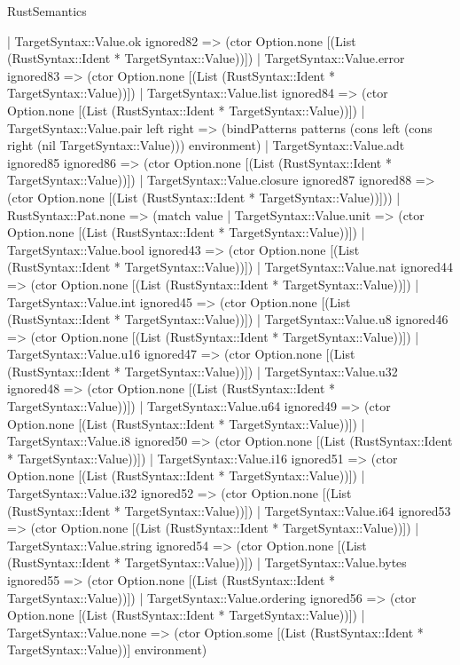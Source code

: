 \begin{lexlean}{RustSemantics}
\begin{semanticmodule}
{      | TargetSyntax::Value.ok ignored82 => (ctor Option.none [(List (RustSyntax::Ident * TargetSyntax::Value))])
      | TargetSyntax::Value.error ignored83 => (ctor Option.none [(List (RustSyntax::Ident * TargetSyntax::Value))])
      | TargetSyntax::Value.list ignored84 => (ctor Option.none [(List (RustSyntax::Ident * TargetSyntax::Value))])
      | TargetSyntax::Value.pair left right => (bindPatterns patterns (cons left (cons right (nil TargetSyntax::Value))) environment)
      | TargetSyntax::Value.adt ignored85 ignored86 => (ctor Option.none [(List (RustSyntax::Ident * TargetSyntax::Value))])
      | TargetSyntax::Value.closure ignored87 ignored88 => (ctor Option.none [(List (RustSyntax::Ident * TargetSyntax::Value))]))
    | RustSyntax::Pat.none => (match value
      | TargetSyntax::Value.unit => (ctor Option.none [(List (RustSyntax::Ident * TargetSyntax::Value))])
      | TargetSyntax::Value.bool ignored43 => (ctor Option.none [(List (RustSyntax::Ident * TargetSyntax::Value))])
      | TargetSyntax::Value.nat ignored44 => (ctor Option.none [(List (RustSyntax::Ident * TargetSyntax::Value))])
      | TargetSyntax::Value.int ignored45 => (ctor Option.none [(List (RustSyntax::Ident * TargetSyntax::Value))])
      | TargetSyntax::Value.u8 ignored46 => (ctor Option.none [(List (RustSyntax::Ident * TargetSyntax::Value))])
      | TargetSyntax::Value.u16 ignored47 => (ctor Option.none [(List (RustSyntax::Ident * TargetSyntax::Value))])
      | TargetSyntax::Value.u32 ignored48 => (ctor Option.none [(List (RustSyntax::Ident * TargetSyntax::Value))])
      | TargetSyntax::Value.u64 ignored49 => (ctor Option.none [(List (RustSyntax::Ident * TargetSyntax::Value))])
      | TargetSyntax::Value.i8 ignored50 => (ctor Option.none [(List (RustSyntax::Ident * TargetSyntax::Value))])
      | TargetSyntax::Value.i16 ignored51 => (ctor Option.none [(List (RustSyntax::Ident * TargetSyntax::Value))])
      | TargetSyntax::Value.i32 ignored52 => (ctor Option.none [(List (RustSyntax::Ident * TargetSyntax::Value))])
      | TargetSyntax::Value.i64 ignored53 => (ctor Option.none [(List (RustSyntax::Ident * TargetSyntax::Value))])
      | TargetSyntax::Value.string ignored54 => (ctor Option.none [(List (RustSyntax::Ident * TargetSyntax::Value))])
      | TargetSyntax::Value.bytes ignored55 => (ctor Option.none [(List (RustSyntax::Ident * TargetSyntax::Value))])
      | TargetSyntax::Value.ordering ignored56 => (ctor Option.none [(List (RustSyntax::Ident * TargetSyntax::Value))])
      | TargetSyntax::Value.none => (ctor Option.some [(List (RustSyntax::Ident * TargetSyntax::Value))] environment)
}
\end{semanticmodule}
\end{lexlean}
